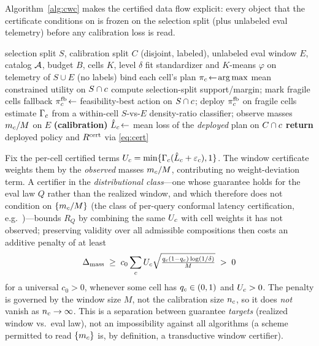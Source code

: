 Algorithm~\ref{alg:cwc} makes the certified data flow explicit: every object that the certificate conditions on is frozen on the selection split (plus unlabeled eval telemetry) before any calibration loss is read.

\begin{algorithm}[t]
\caption{\CWC{}: certified workload-window compilation. Steps 1--5 use only the selection split and unlabeled eval features; step 6 is the sole use of calibration losses.}
\label{alg:cwc}
\begin{algorithmic}[1]
\REQUIRE selection split $S$, calibration split $C$ (disjoint, labeled), unlabeled eval window $E$, catalog $\mathcal{A}$, budget $B$, cells $K$, level $\delta$
\STATE fit standardizer and $K$-means $\varphi$ on telemetry of $S\cup E$ \hfill(no labels)
\STATE bind each cell's plan $\pi_c\!\leftarrow\!\operatorname*{arg\,max}$ mean constrained utility on $S\cap c$
\STATE compute selection-split support/margin; mark fragile cells
\STATE fallback $\pi^{\mathrm{fb}}_c\!\leftarrow$ feasibility-best action on $S\cap c$; deploy $\pi^{\mathrm{fb}}_c$ on fragile cells
\STATE estimate $\Gamma_c$ from a within-cell $S$-vs-$E$ density-ratio classifier; observe masses $m_c/M$ on $E$
\STATE \textbf{(calibration)} $\hat L_c\!\leftarrow$ mean loss of the \emph{deployed} plan on $C\cap c$
\STATE \textbf{return} deployed policy and $R^{\mathrm{cert}}$ via \eqref{eq:cert}
\end{algorithmic}
\end{algorithm}

\begin{proposition}
\label{prop:sep}
Fix the per-cell certified terms $U_c=\min\{\Gamma_c(\hat L_c+\varepsilon_c),1\}$. The window certificate weights them by the \emph{observed} masses $m_c/M$, contributing no weight-deviation term. A certifier in the \emph{distributional class}---one whose guarantee holds for the eval law $Q$ rather than the realized window, and which therefore does not condition on $\{m_c/M\}$ (the class of per-query conformal latency certification, e.g.\ \cite{cp4lqo2025})---bounds $R_Q$ by combining the same $U_c$ with cell weights it has not observed; preserving validity over all admissible compositions then costs an additive penalty of at least
\[
\Delta_{\mathrm{mass}} \;\ge\; c_0\sum_c U_c\sqrt{\tfrac{q_c(1-q_c)\log(1/\delta)}{M}}\;>\;0
\]
for a universal $c_0>0$, whenever some cell has $q_c\in(0,1)$ and $U_c>0$. The penalty is governed by the window size $M$, not the calibration size $n_c$, so it does \emph{not} vanish as $n_c\to\infty$. This is a separation between guarantee \emph{targets} (realized window vs.\ eval law), not an impossibility against all algorithms (a scheme permitted to read $\{m_c\}$ is, by definition, a transductive window certifier).
\end{proposition}

